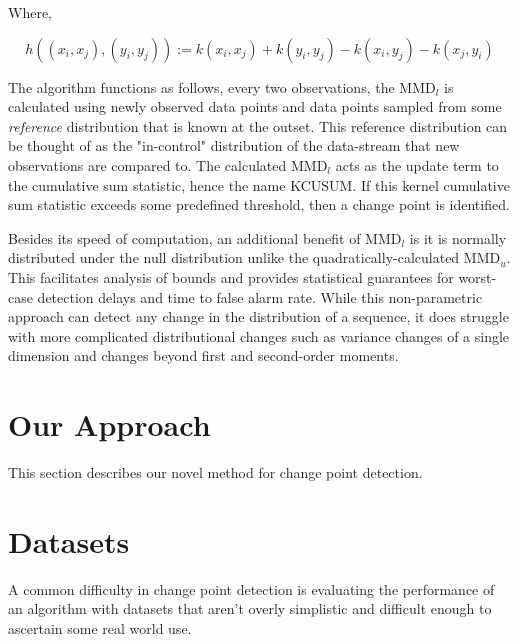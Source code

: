 Where,

$$h\left((x_i, x_j), (y_i, y_j)\right):=k\left(x_{i}, x_{j}\right)+k\left(y_{i}, y_{j}\right)-k\left(x_{i}, y_{j}\right)-k\left(x_{j}, y_{i}\right)$$

The algorithm functions as follows, every two observations, the MMD$_l$ is calculated using newly observed data points and data points sampled from some \textit{reference} distribution that is known at the outset. This reference distribution can be thought of as the "in-control" distribution of the data-stream that new observations are compared to. The calculated MMD$_l$ acts as the update term to the cumulative sum statistic, hence the name KCUSUM. If this kernel cumulative sum statistic exceeds some predefined threshold, then a change point is identified. 

Besides its speed of computation, an additional benefit of MMD$_l$ is it is normally distributed under the null distribution unlike the quadratically-calculated MMD$_u$. This facilitates analysis of bounds and provides statistical guarantees for worst-case detection delays and time to false alarm rate. While this non-parametric approach can detect any change in the distribution of a sequence, it does struggle with more complicated distributional changes such as variance changes of a single dimension and changes beyond first and second-order moments.


\section{Our Approach}

This section describes our novel method for change point detection.



\section{Datasets}
A common difficulty in change point detection is evaluating the performance of an algorithm with datasets that aren't overly simplistic and difficult enough to ascertain some real world use.

